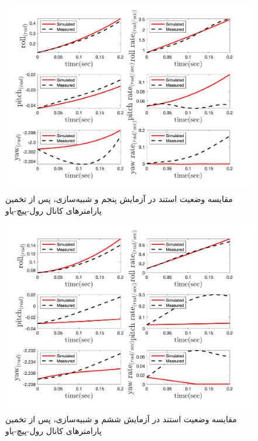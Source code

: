 \begin{figure}[H]
	\includegraphics[width=12cm]{../../Figures/RCP/roll_pitch_yaw_parameter_estimation/RCP_roll_pitch_yaw_S6.png}
	\centering
	\caption{مقايسه وضعیت استند در  آزمايش پنجم و شبیه‌سازی، پس از تخمین پارامترهای کانال رول-پیچ-یاو}
	\label{ roll_pitch_yaw_ps5}
\end{figure}
\begin{figure}[H]
	\includegraphics[width=12cm]{../../Figures/RCP/roll_pitch_yaw_parameter_estimation/RCP_roll_pitch_yaw_S7.png}
	\centering
	\caption{مقايسه وضعیت استند در  آزمايش ششم و شبیه‌سازی، پس از تخمین پارامترهای کانال رول-پیچ-یاو}
	\label{ roll_pitch_yaw_ps6}
\end{figure}
